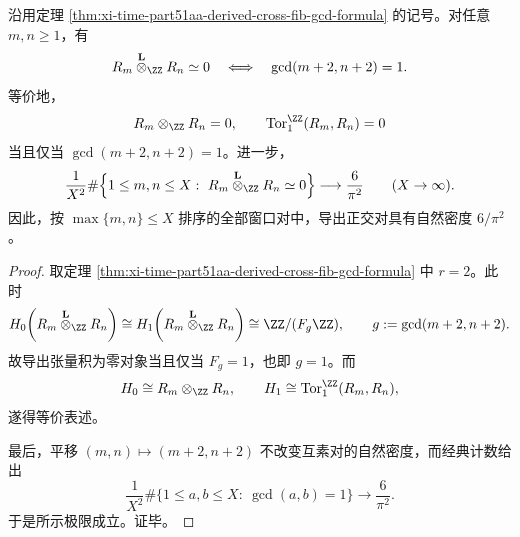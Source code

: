 \begin{corollary}[二窗折叠同余商的导出正交性具有正密度]\label{cor:xi-time-part51aa-derived-orthogonality-positive-density}
沿用定理 \ref{thm:xi-time-part51aa-derived-cross-fib-gcd-formula} 的记号。对任意 \(m,n\ge 1\)，有
\[
R_m\overset{\mathbf L}{\otimes}_{\ZZ}R_n\simeq 0
\quad\Longleftrightarrow\quad
\gcd(m+2,n+2)=1.
\]
等价地，
\[
R_m\otimes_{\ZZ}R_n=0,
\qquad
\operatorname{Tor}_1^{\ZZ}(R_m,R_n)=0
\]
当且仅当 \(\gcd(m+2,n+2)=1\)。进一步，
\[
\frac{1}{X^2}
\#\Bigl\{
1\le m,n\le X:\ 
R_m\overset{\mathbf L}{\otimes}_{\ZZ}R_n\simeq 0
\Bigr\}
\longrightarrow
\frac{6}{\pi^2}
\qquad(X\to\infty).
\]
因此，按 \(\max\{m,n\}\le X\) 排序的全部窗口对中，导出正交对具有自然密度 \(6/\pi^2\)。
\end{corollary}
\begin{proof}
取定理 \ref{thm:xi-time-part51aa-derived-cross-fib-gcd-formula} 中 \(r=2\)。此时
\[
H_0\!\left(R_m\overset{\mathbf L}{\otimes}_{\ZZ}R_n\right)
\cong
H_1\!\left(R_m\overset{\mathbf L}{\otimes}_{\ZZ}R_n\right)
\cong
\ZZ/(F_g\ZZ),
\qquad
g:=\gcd(m+2,n+2).
\]
故导出张量积为零对象当且仅当 \(F_g=1\)，也即 \(g=1\)。而
\[
H_0\cong R_m\otimes_{\ZZ}R_n,
\qquad
H_1\cong \operatorname{Tor}_1^{\ZZ}(R_m,R_n),
\]
遂得等价表述。

最后，平移 \((m,n)\mapsto (m+2,n+2)\) 不改变互素对的自然密度，而经典计数给出
\[
\frac{1}{X^2}\#\{1\le a,b\le X:\ \gcd(a,b)=1\}\longrightarrow \frac{6}{\pi^2}.
\]
于是所示极限成立。证毕。
\end{proof}

